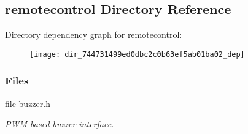 \subsection{remotecontrol Directory Reference}
\label{dir_744731499ed0dbc2c0b63ef5ab01ba02}
Directory dependency graph for remotecontrol\+:
\nopagebreak
\begin{figure}[H]
\begin{center}
\leavevmode
\texttt{[image: dir\_744731499ed0dbc2c0b63ef5ab01ba02\_dep]}
\end{center}
\end{figure}
\subsubsection*{Files}
\begin{DoxyCompactItemize}
\item 
file \hyperlink{buzzer_8h}{buzzer.\+h}
\begin{DoxyCompactList}\small\item\em P\+W\+M-\/based buzzer interface. \end{DoxyCompactList}\end{DoxyCompactItemize}
